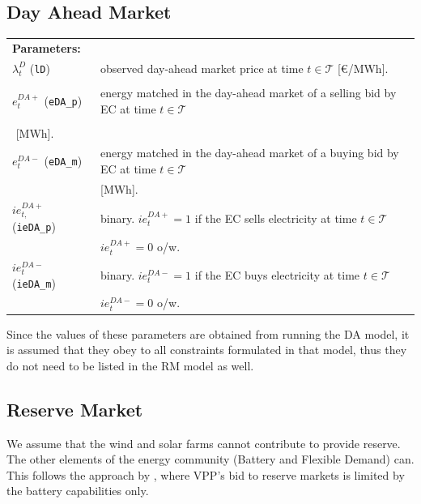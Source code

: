 \documentclass{article}
\begin{document}
\subsection{Day Ahead Market}



\begin{tabularx}{\textwidth}{l l}

	\\
    \textbf{Parameters:} \\
	$\lambda^{D}_{t}$ (\verb|lD|) & observed day-ahead market price at time $t \in \mathcal{T}$  [\euro/MWh]. \\
       \\
	$e^{DA+}_{t}$ (\verb|eDA_p|) & energy matched in the day-ahead market of a selling bid by EC at time $t \in \mathcal{T}$ \\
    \\
	$ $ [MWh]. \\
    
	$e^{DA-}_{t}$ (\verb|eDA_m|) & energy matched in the day-ahead market of a buying bid by EC at time $t \in \mathcal{T}$ \\
	& [MWh]. 
    \\
    $ie^{DA+}_{t,}$ (\verb|ieDA_p|) & binary. $ie^{DA+}_{t} = 1$ if the EC sells electricity at time $t \in \mathcal{T}$ \\
	& $ie^{DA+}_{t} = 0$ o/w. \\
	$ie^{DA-}_{t}$ (\verb|ieDA_m|) & binary. $ie^{DA-}_{t} = 1$ if the EC buys electricity at time $t \in \mathcal{T}$ \\
	& $ie^{DA-}_{t} = 0$ o/w.
\end{tabularx}

Since the values of these parameters are obtained from running the DA model, it is assumed that they obey to all constraints formulated in that model, thus they do not need to be listed in the RM model as well.

\subsection{Reserve Market}
We assume that the wind and solar farms cannot contribute to provide reserve. The other elements of the energy community (Battery and Flexible Demand) can. This follows the approach by \textcite{Heredia18}, where VPP's bid to reserve markets is limited by the battery capabilities only.
\end{document}
